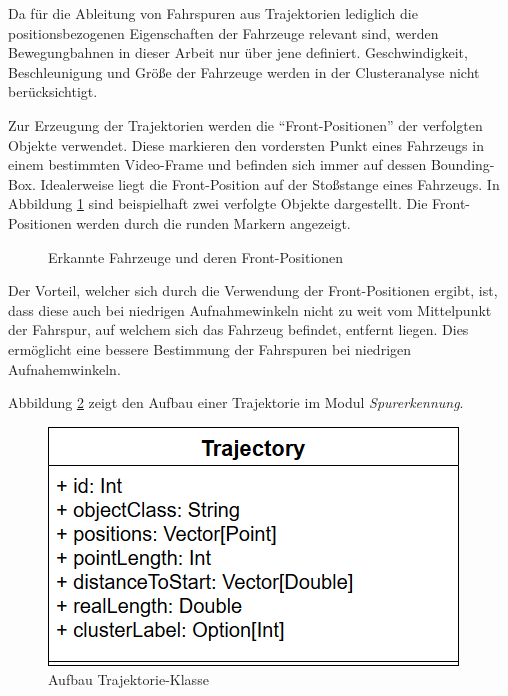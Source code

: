 Da für die Ableitung von Fahrspuren aus Trajektorien lediglich die positionsbezogenen Eigenschaften
der Fahrzeuge relevant sind, werden Bewegungbahnen in dieser Arbeit nur über jene definiert.
Geschwindigkeit, Beschleunigung und Größe der Fahrzeuge werden in der Clusteranalyse nicht berücksichtigt.

Zur Erzeugung der Trajektorien werden die ``Front-Positionen'' der verfolgten Objekte verwendet. Diese markieren den
vordersten Punkt eines Fahrzeugs in einem bestimmten Video-Frame und befinden sich immer auf dessen Bounding-Box.
Idealerweise liegt die Front-Position auf der Stoßstange eines Fahrzeugs. In Abbildung \ref{fig:real1_tracked_object_front_position}
sind beispielhaft zwei verfolgte Objekte dargestellt. Die Front-Positionen werden durch die runden Markern angezeigt.

\begin{figure}[H]
    \centering
    \qquad \qquad
    \caption{Erkannte Fahrzeuge und deren Front-Positionen}
    \label{fig:real1_tracked_object_front_position}
\end{figure}

Der Vorteil, welcher sich durch die Verwendung der Front-Positionen ergibt, ist, dass diese auch bei niedrigen
Aufnahmewinkeln nicht zu weit vom Mittelpunkt der Fahrspur, auf welchem sich das Fahrzeug befindet, entfernt liegen.
Dies ermöglicht eine bessere Bestimmung der Fahrspuren bei niedrigen Aufnahemwinkeln.

Abbildung \ref{fig:real_trajectory_classDia} zeigt den Aufbau einer Trajektorie im Modul \textit{Spurerkennung}.

\begin{figure}[H]
\centering
    \includegraphics[width=0.35\linewidth]{resources/img/umsetzung/U1/Trajectory_ClassDia}
\caption{Aufbau Trajektorie-Klasse}
\label{fig:real_trajectory_classDia}
\end{figure}

